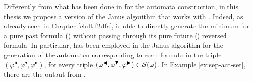 Differently from what has been done in \citep{cecconi2018interestingness} for the automata construction, in this thesis we propose a version of the Janus algorithm that works with \LTLfToDFA. Indeed, as already seen in Chapter \ref{ch:ltlf2dfa}, \LTLfToDFA is able to directly generate the minimum \DFA for a pure past formula (\PLTL) without passing through its pure future (\LTLf) reversed formula. In particular, \LTLfToDFA has been employed in the Janus algorithm for the generation of the automaton corresponding to each formula in the triple $(\varphi^{\blacktriangleleft},\varphi^{\blacktriangledown},\varphi^{\blacktriangleright})$, for every triple $(\varphi^{\blacktriangleleft},\varphi^{\blacktriangledown},\varphi^{\blacktriangleright}) \in \S(\varphi)$. In Example \ref{ex:sep-aut-set}, there are the \DFAs output from \LTLfToDFA.

